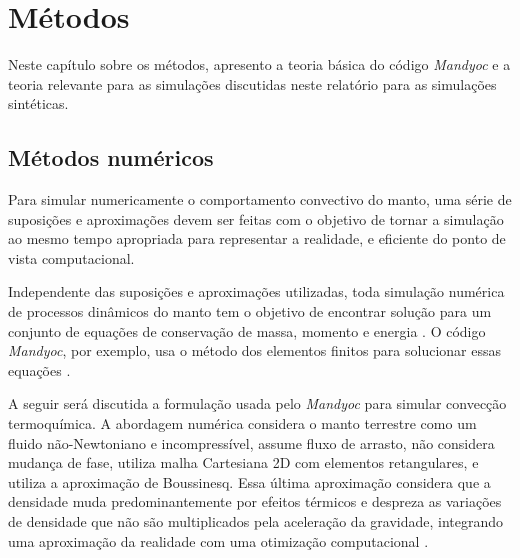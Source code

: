 \chapter{Métodos}
\label{metodos}


Neste capítulo sobre os métodos, apresento a teoria básica do código \textit{Mandyoc} e a teoria relevante para as simulações discutidas neste relatório para as simulações sintéticas.

\section{Métodos numéricos}
\label{sec:metodosNumericos}

Para simular numericamente o comportamento convectivo do manto, uma série de suposições e aproximações devem ser feitas com o objetivo de tornar a simulação ao mesmo tempo apropriada para representar a realidade, e eficiente do ponto de vista computacional. 
    

Independente das suposições e aproximações utilizadas, toda simulação numérica de processos dinâmicos do manto tem o objetivo de encontrar solução para um conjunto de equações de conservação de massa, momento e energia \citep{zhong2015treatise}.  O código \textit{Mandyoc}, por exemplo, usa o método dos elementos finitos para solucionar essas equações \citep{sacek2022mandyoc}. 

A seguir será discutida a formulação usada pelo \textit{Mandyoc} para simular convecção termoquímica. A abordagem numérica considera o manto terrestre como um fluido não-Newtoniano e incompressível, assume fluxo de arrasto, não considera mudança de fase, utiliza malha Cartesiana 2D com elementos retangulares, e utiliza a aproximação de Boussinesq. Essa última aproximação considera que a densidade muda predominantemente por efeitos térmicos e despreza as variações de densidade que não são multiplicados pela aceleração da gravidade, integrando uma aproximação da realidade com uma otimização computacional \citep{spiegel1960boussinesq}.

